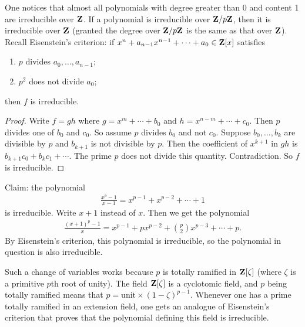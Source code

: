 \documentclass[11pt, oneside,margin=1in]{article}
\begin{document}
One notices that almost all polynomials with degree greater than $0$ and content 1 are irreducible over $\mathbf Z$. If a polynomial is irreducible over $\mathbf Z / p\mathbf Z$, then it is irreducible over $\mathbf Z$ (granted the degree over $\mathbf Z / p\mathbf Z$ is the same as that over $\mathbf Z$). Recall {Eisenstein's criterion}: if $x^n + a_{n-1}x^{n-1} + \cdots + a_0 \in \mathbf Z[x]$ satisfies
 \begin{enumerate}
	\item $p$ divides $a_0,\hdots, a_{n-1}$;
	\item $p^2$ does not divide $a_0$;
\end{enumerate}
then $f$ is irreducible.
\begin{proof}
Write $f=gh$ where $g = x^m + \cdots + b_0$ and $h = x^{n-m} + \cdots + c_0$. Then $p$ divides one of $b_0$ and $c_0$. So assume $p$ divides $b_0$ and not $c_0$. Suppose $b_0,\hdots, b_k$ are divisible by $p$ and $b_{k+1}$ is not divisible by $p$. Then the coefficient of $x^{k+1}$ in $gh$ is $b_{k+1}c_0 + b_kc_1 + \cdots $. The prime $p$ does not divide this quantity. Contradiction. So $f$ is irreducible.
\end{proof}
\begin{example}\label{}
Claim: the polynomial
 \begin{align*}
	\frac{x^p-1}{x-1}=x^{p-1} + x^{p-2} + \cdots + 1
\end{align*}
is irreducible. Write $ x+1$ instead of $x$. Then we get the polynomial \begin{align*}
	\frac{(x+1)^p -1}{x} = x^{p-1} + px^{p-2} + \binom{p}{2}x^{p-3} + \cdots + p.
\end{align*}
By Eisenstein's criterion, this polynomial is irreducible, so the polynomial in question is also irreducible. 
\end{example}
Such a change of variables works because $p$ is {totally ramified} in $\mathbf Z[\zeta]$ (where $\zeta$ is a primitive $p$th root of unity). The field $\mathbf Z[\zeta]$ is a cyclotomic field, and $p$ being totally ramified means that $p= \mathrm{unit}\times (1-\zeta)^{p-1}$. Whenever one has a prime totally ramified in an extension field, one gets an analogue of Eisenstein's criterion that proves that the polynomial defining this field is irreducible.
\end{document}
